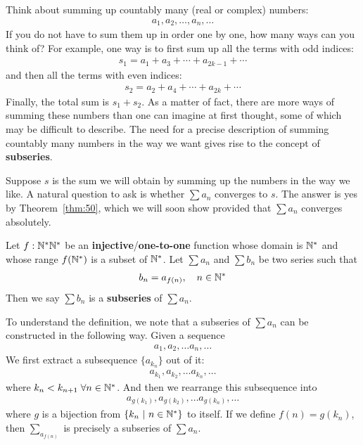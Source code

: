 \documentclass[thmcnt=section, 12pt]{my-elegantbook}
\begin{document}
Think about summing up countably many (real or complex) numbers:
\begin{align*}
    a_1, a_2, \ldots, a_n, \ldots
\end{align*}
If you do not have to sum them up in order one by one, how many ways can you think of? For example, one way is to first sum up all the terms with odd indices:
\begin{align*}
    s_1 = a_1 + a_3 + \cdots + a_{2k-1} + \cdots
\end{align*}
and then all the terms with even indices:
\begin{align*}
    s_2 = a_2 + a_4 + \cdots + a_{2k} + \cdots
\end{align*}
Finally, the total sum is $s_1 + s_2$. As a matter of fact, there are more ways of summing these numbers than one can imagine at first thought, some of which may be difficult to describe. The need for a precise description of summing countably many numbers in the way we want gives rise to the concept of \textbf{subseries}.

Suppose $s$ is the sum we will obtain by summing up the numbers in the way we like. A natural question to ask is whether $\sum a_n$ converges to $s$. The answer is yes by Theorem~\ref{thm:50}, which we will soon show provided that $\sum a_n$ converges absolutely.


\begin{definition}
    Let $f: \mathbb{N}^\ast \mathbb{N}^\ast$ be an \textbf{injective}/\textbf{one-to-one} function whose domain is $\mathbb{N}^\ast$ and whose range $f(\mathbb{N}^\ast)$ is a subset of $\mathbb{N}^\ast$. Let $\sum a_n$ and $\sum b_n$ be two series such that
    \begin{align*}
        b_n = a_{f(n)},
        \quad n \in \mathbb{N}^\ast
    \end{align*}
    Then we say $\sum b_n$ is a \textbf{subseries} of $\sum a_n$.
\end{definition}

To understand the definition, we note that a subseries of $\sum a_n$ can be constructed in the following way. Given a sequence
\begin{align*}
    a_1, a_2, \ldots a_n, \ldots
\end{align*}
We first extract a subsequence $\{a_{k_n}\}$ out of it:
\begin{align*}
    a_{k_1}, a_{k_2}, \ldots a_{k_n}, \ldots
\end{align*}
where $k_{n} < k_{n+1} \; \forall n \in \mathbb{N}^\ast$. And then we rearrange this subsequence into
\begin{align*}
    a_{g(k_1)}, a_{g(k_2)}, \ldots a_{g(k_n)}, \ldots
\end{align*}
where $g$ is a bijection from $\left\{ k_n \ \middle| \ n \in \mathbb{N}^\ast \right\}$ to itself. If we define $f(n) = g(k_n)$, then $\sum_{a_{f(n)}}$ is precisely a subseries of $\sum a_n$.
\end{document}
